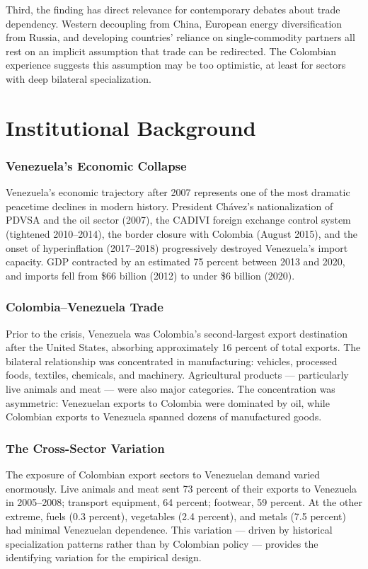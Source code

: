 \documentclass[12pt]{article}
\begin{document}
Third, the finding has direct relevance for contemporary debates about trade dependency. Western decoupling from China, European energy diversification from Russia, and developing countries' reliance on single-commodity partners all rest on an implicit assumption that trade can be redirected. The Colombian experience suggests this assumption may be too optimistic, at least for sectors with deep bilateral specialization.

\section{Institutional Background}

\subsubsection*{Venezuela's Economic Collapse} Venezuela's economic trajectory after 2007 represents one of the most dramatic peacetime declines in modern history. President Ch\'avez's nationalization of PDVSA and the oil sector (2007), the CADIVI foreign exchange control system (tightened 2010--2014), the border closure with Colombia (August 2015), and the onset of hyperinflation (2017--2018) progressively destroyed Venezuela's import capacity. GDP contracted by an estimated 75 percent between 2013 and 2020, and imports fell from \$66 billion (2012) to under \$6 billion (2020).

\subsubsection*{Colombia--Venezuela Trade} Prior to the crisis, Venezuela was Colombia's second-largest export destination after the United States, absorbing approximately 16 percent of total exports. The bilateral relationship was concentrated in manufacturing: vehicles, processed foods, textiles, chemicals, and machinery. Agricultural products --- particularly live animals and meat --- were also major categories. The concentration was asymmetric: Venezuelan exports to Colombia were dominated by oil, while Colombian exports to Venezuela spanned dozens of manufactured goods.

\subsubsection*{The Cross-Sector Variation} The exposure of Colombian export sectors to Venezuelan demand varied enormously. Live animals and meat sent 73 percent of their exports to Venezuela in 2005--2008; transport equipment, 64 percent; footwear, 59 percent. At the other extreme, fuels (0.3 percent), vegetables (2.4 percent), and metals (7.5 percent) had minimal Venezuelan dependence. This variation --- driven by historical specialization patterns rather than by Colombian policy --- provides the identifying variation for the empirical design.
\end{document}
